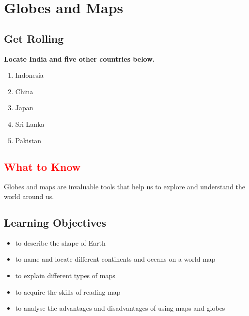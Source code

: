\chapter{Globes and Maps}
\section{\textbf{Get Rolling}}
\textbf{Locate India and five other countries below.}
\begin{enumerate}
    \item Indonesia
    \item China
    \item Japan
    \item Sri Lanka
    \item Pakistan
\end{enumerate}
\section{\textcolor{red}{What to Know}}
Globes and maps are invaluable tools that help us to explore and understand the world around us.
\section{\textbf{Learning Objectives}}
\begin{itemize}
    \item to describe the shape of Earth
    \item to name and locate different continents and oceans on a world map
    \item to explain different types of maps
    \item to acquire the skills of reading map
    \item to analyse the advantages and disadvantages of using maps and globes
\end{itemize}
